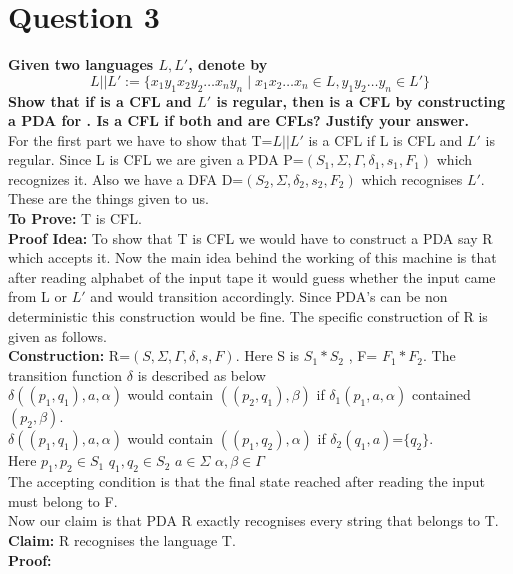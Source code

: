 \documentclass{article}
\begin{document}
\section{Question 3}
\textbf{Given two languages $L, L'$, denote by $$L||L' := \{x_1y_1x_2y_2 \dots x_ny_n \mid x_1x_2 \dots x_n \in L, y_1y_2\dots y_n \in L'\}$$ Show that if  is a CFL and $L'$ is regular, then  is a CFL by constructing a PDA for . Is  a CFL if both  and  are CFLs? Justify your answer.}\\
\newline 
For the first part we have to show that T=$L||L'$ is a CFL if L is CFL and $L'$ is regular. Since L is CFL we are given a PDA P=$(S_1,\Sigma,\Gamma,\delta_1,s_1,F_1)$ which recognizes it. Also we have a DFA D=$(S_2,\Sigma,\delta_2,s_2,F_2)$ which recognises $L'$. These are the things given to us.\\
\textbf{To Prove:} T is CFL.\\
\textbf{Proof Idea:} To show that T is CFL we would have to construct a PDA say R which accepts it. Now the main idea behind the working of this machine is that after reading alphabet of the input tape it would guess whether the input came from L or $L'$ and would transition accordingly. Since PDA's can be non deterministic this construction would be fine. The specific construction of R is given as follows.\\
\textbf{Construction:} R=$(S,\Sigma,\Gamma,\delta,s,F)$. Here S is  $S_1 * S_2$ , F= $F_1 * F_2$. The transition function $\delta$ is described as below\\
$\delta((p_1 ,q_1),a,\alpha)$ would contain $((p_2,q_1),\beta)$ if $\delta_1(p_1,a,\alpha)$ contained $(p_2,\beta)$.\\
$\delta((p_1 ,q_1),a,\alpha)$ would contain $((p_1,q_2),\alpha)$ if $\delta_2(q_1,a)$=$\{q_2\}$.\\
Here $p_1,p_2 \in S_1$  $q_1,q_2 \in S_2$  $a \in \Sigma$  $\alpha , \beta \in \Gamma$\\
The accepting condition is that the final state reached after reading the input must belong to F.\\
Now our claim is that PDA R exactly recognises every string that belongs to T. \\
\textbf{Claim:} R recognises the language T.\\
\textbf{Proof:}\\
\\
\end{document}
